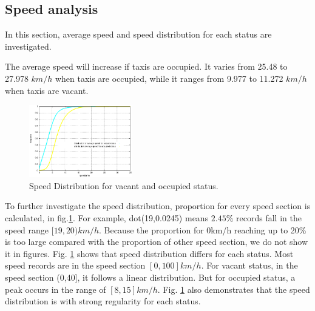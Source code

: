 \subsection{Speed analysis}
In this section, average speed and speed distribution for each status are investigated.

The average speed will increase if taxis are occupied. It varies from 25.48 to 27.978 $km/h$ when taxis are occupied, while it ranges from 9.977 to 11.272 $km/h$ when taxis are vacant.



\begin{figure}
\centering
\includegraphics[width=0.4\textwidth]{figures_201103/assumption/speeddis.eps}
\caption{Speed Distribution for vacant and occupied status.}\label{figure_speed_distribution}
\end{figure}

 To further investigate the speed distribution, proportion for every speed section is calculated, in fig.\ref{figure_speed_distribution}. For example, dot(19,0.0245) means $2.45\%$ records fall in the speed range $[19,20)km/h$. Because the proportion for 0km/h reaching up to 20\% is too large compared with the proportion of other speed section, we do not show it in figures.
Fig. \ref{figure_speed_distribution} shows that speed distribution differs for each status. Most speed records are in the speed section $[0,100] km/h$. For vacant status, in the speed section (0,40], it follows a linear distribution. But for occupied status, a peak occurs in the range of $[8,15] km/h$.  Fig. \ref{figure_speed_distribution} also demonstrates that the speed distribution is with strong regularity for each status.


